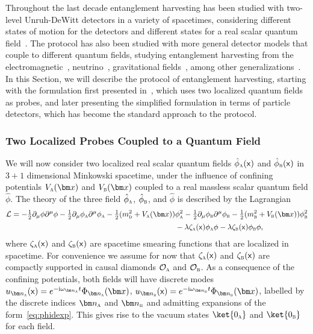 \documentclass[letterpaper,12pt,titlepage,oneside,final]{book}
\newcommand{\mf}{\mathsf}%
\newcommand{\ii}{\mathrm{i}}
\newcommand{\tc}[1]{\textsc{#1}}
\begin{document}
Throughout the last decade entanglement harvesting has been studied with two-level Unruh-DeWitt detectors in a variety of spacetimes, considering different states of motion for the detectors and different states for a real scalar quantum field~\cite{Reznik2005,Retzker2005,Reznik2007,Salton:2014jaa,Pozas-Kerstjens:2015,Ng1,Henderson2019,bandlimitedHarv2020,ampEntBH2020,HarvestingDelocalized,ericksonNew,HarvestingAccelerationRobb,twist2022,cisco2023harvesting,SchwarzchildHarvestingWellDone}. The protocol has also been studied with more general detector models that couple to different quantum fields, studying entanglement harvesting from the electromagnetic~\cite{Pozas2016}, neutrino~\cite{carol}, gravitational fields~\cite{boris}, among other generalizations~\cite{HarvestingSuperposed,threeHarvesting2022,tripartiteBHarvesting}. In this Section, we will describe the protocol of entanglement harvesting, starting with the formulation first presented in~\cite{FullHarvesting}, which uses two localized quantum fields as probes, and later presenting the simplified formulation in terms of particle detectors, which has become the standard approach to the protocol.



\subsubsection*{Two Localized Probes Coupled to a Quantum Field}

    We will now consider two localized real scalar quantum fields $\hat{\phi}_\tc{a}(\mf x)$ and $\hat{\phi}_\tc{b}(\mf x)$ in $3+1$ dimensional Minkowski spacetime, under the influence of confining potentials $V_\tc{a}(\bm x)$ and $V_\tc{b}(\bm x)$ coupled to a real massless scalar quantum field $\hat{\phi}$. The theory of the three field $\hat{\phi}_\tc{a}$, $\hat{\phi}_\tc{b}$, and $\hat{\phi}$ is described by the Lagrangian
    \begin{align}
        \mathcal{L} = -\tfrac{1}{2} \partial_\mu \phi\partial^\mu \phi -\tfrac{1}{2} \partial_\mu \phi_\tc{a}\partial^\mu \phi_\tc{a} - \tfrac{1}{2}(m_\tc{d}^2 + V_\tc{a}(\bm x))&\phi_\tc{a}^2-\tfrac{1}{2} \partial_\mu \phi_\tc{b}\partial^\mu \phi_\tc{b}- \tfrac{1}{2}(m_\tc{b}^2 + V_\tc{b}(\bm x))\phi_\tc{b}^2 \nonumber\\[2pt]
        &- \lambda \zeta_\tc{a}(\mf x) \phi_\tc{a} \phi - \lambda \zeta_\tc{b}(\mf x) \phi_\tc{b} \phi,
    \end{align}
    where $\zeta_\tc{a}(\mf x)$ and $\zeta_{\tc{b}}(\mf x)$ are spacetime smearing functions that are localized in spacetime. For convenience we assume for now that $\zeta_\tc{a}(\mf x)$ and $\zeta_{\tc{b}}(\mf x)$ are compactly supported in causal diamonds $\mathcal{O}_\tc{a}$ and $\mathcal{O}_\tc{b}$. As a consequence of the confining potentials, both fields will have discrete modes $u_{\bm n_\tc{a}}(\mf x) = e^{- \ii \omega_{\bm n_\tc{a}}t} \Phi_{\bm n_{\tc{a}}}(\bm x)$, $u_{\bm n_\tc{b}}(\mf x) = e^{- \ii \omega_{\bm n_\tc{b}}t} \Phi_{\bm n_{\tc{b}}}(\bm x)$, labelled by the discrete indices $\bm n_\tc{a}$ and $\bm n_{\tc{b}}$ and admitting expansions of the form~\eqref{eq:phidexp}. This gives rise to the vacuum states $\ket{0_\tc{a}}$ and $\ket{0_\tc{b}}$ for each field. 
    
\end{document}
